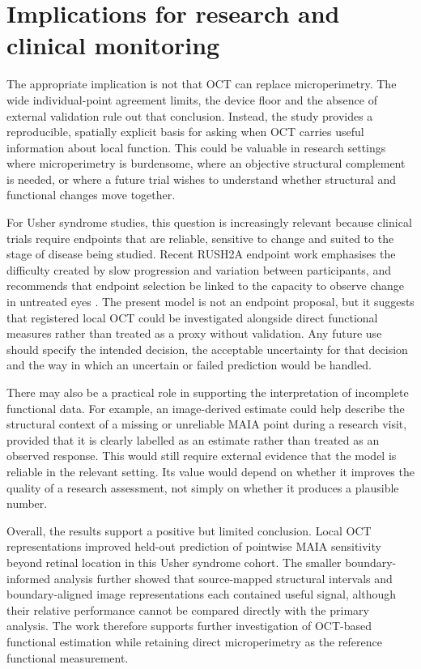 \section{Implications for research and clinical monitoring}

The appropriate implication is not that OCT can replace microperimetry. The wide individual-point agreement limits, the device floor and the absence of external validation rule out that conclusion. Instead, the study provides a reproducible, spatially explicit basis for asking when OCT carries useful information about local function. This could be valuable in research settings where microperimetry is burdensome, where an objective structural complement is needed, or where a future trial wishes to understand whether structural and functional changes move together.

For Usher syndrome studies, this question is increasingly relevant because clinical trials require endpoints that are reliable, sensitive to change and suited to the stage of disease being studied. Recent RUSH2A endpoint work emphasises the difficulty created by slow progression and variation between participants, and recommends that endpoint selection be linked to the capacity to observe change in untreated eyes \citep{Maguire2024}. The present model is not an endpoint proposal, but it suggests that registered local OCT could be investigated alongside direct functional measures rather than treated as a proxy without validation. Any future use should specify the intended decision, the acceptable uncertainty for that decision and the way in which an uncertain or failed prediction would be handled.

There may also be a practical role in supporting the interpretation of incomplete functional data. For example, an image-derived estimate could help describe the structural context of a missing or unreliable MAIA point during a research visit, provided that it is clearly labelled as an estimate rather than treated as an observed response. This would still require external evidence that the model is reliable in the relevant setting. Its value would depend on whether it improves the quality of a research assessment, not simply on whether it produces a plausible number.

Overall, the results support a positive but limited conclusion. Local OCT representations improved held-out prediction of pointwise MAIA sensitivity beyond retinal location in this Usher syndrome cohort. The smaller boundary-informed analysis further showed that source-mapped structural intervals and boundary-aligned image representations each contained useful signal, although their relative performance cannot be compared directly with the primary analysis. The work therefore supports further investigation of OCT-based functional estimation while retaining direct microperimetry as the reference functional measurement.
